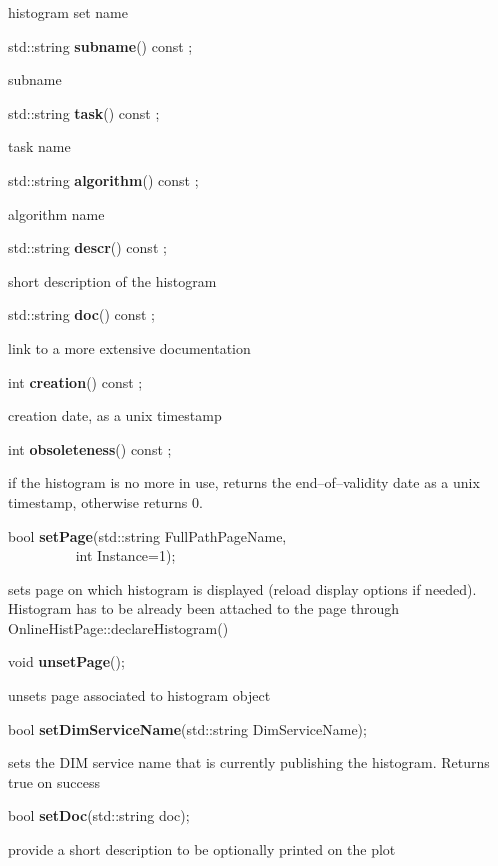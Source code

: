  histogram set name


\item    std::string {\bf subname}() const ;

 subname


\item    std::string {\bf task}() const ;

 task name


\item    std::string {\bf algorithm}() const ;

 algorithm name


\item    std::string {\bf descr}() const ;

 short description of the histogram


\item    std::string {\bf doc}() const ;

 link to a more extensive documentation


\item    int {\bf creation}() const ;

 creation date, as a unix timestamp


\item    int {\bf obsoleteness}() const ;

 if the histogram is no more in use, returns the end--of--validity date
 as a unix timestamp, otherwise returns 0.


\item    bool {\bf setPage}(std::string FullPathPageName,\\\mbox{}~~~~~~~~~
	       int Instance=1);

 sets page on which histogram is displayed (reload display options if needed). Histogram has to be already
 been attached to the page through OnlineHistPage::declareHistogram()


\item    void {\bf unsetPage}();


 unsets page associated to histogram object


\item    bool {\bf setDimServiceName}(std::string DimServiceName);


 sets the DIM service name that is currently publishing the histogram. Returns true on success


\item    bool {\bf setDoc}(std::string doc);


 provide a short description to be optionally printed on the plot 


